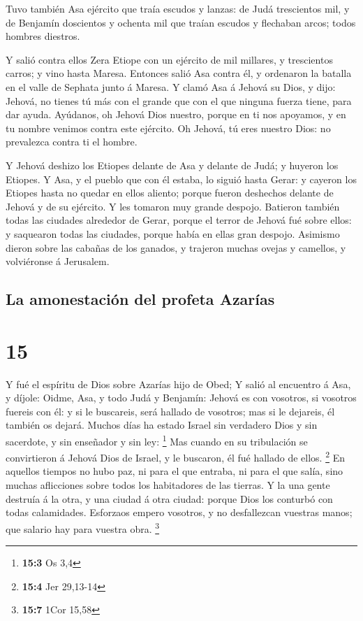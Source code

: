  Tuvo también Asa ejército que traía escudos y lanzas: de
Judá trescientos mil, y de Benjamín doscientos y ochenta mil que traían
escudos y flechaban arcos; todos hombres diestros.

 Y salió contra ellos Zera Etiope con un ejército de mil
millares, y trescientos carros; y vino hasta Maresa. 
Entonces salió Asa contra él, y ordenaron la batalla en el valle de
Sephata junto á Maresa.  Y clamó Asa á Jehová su Dios, y
dijo: Jehová, no tienes tú más con el grande que con el que ninguna
fuerza tiene, para dar ayuda. Ayúdanos, oh Jehová Dios nuestro, porque
en ti nos apoyamos, y en tu nombre venimos contra este ejército. Oh
Jehová, tú eres nuestro Dios: no prevalezca contra ti el hombre.

 Y Jehová deshizo los Etiopes delante de Asa y delante de
Judá; y huyeron los Etiopes.  Y Asa, y el pueblo que con
él estaba, lo siguió hasta Gerar: y cayeron los Etiopes hasta no quedar
en ellos aliento; porque fueron deshechos delante de Jehová y de su
ejército. Y les tomaron muy grande despojo.  Batieron
también todas las ciudades alrededor de Gerar, porque el terror de
Jehová fué sobre ellos: y saquearon todas las ciudades, porque había en
ellas gran despojo.  Asimismo dieron sobre las cabañas de
los ganados, y trajeron muchas ovejas y camellos, y volviéronse á
Jerusalem.

\hypertarget{la-amonestaciuxf3n-del-profeta-azaruxedas}{%
\subsection{La amonestación del profeta
Azarías}\label{la-amonestaciuxf3n-del-profeta-azaruxedas}}

\hypertarget{section-14}{%
\section{15}\label{section-14}}

 Y fué el espíritu de Dios sobre Azarías hijo de Obed;
 Y salió al encuentro á Asa, y díjole: Oidme, Asa, y todo
Judá y Benjamín: Jehová es con vosotros, si vosotros fuereis con él: y
si le buscareis, será hallado de vosotros; mas si le dejareis, él
también os dejará.  Muchos días ha estado Israel sin
verdadero Dios y sin sacerdote, y sin enseñador y sin ley: \footnote{\textbf{15:3}
  Os 3,4}  Mas cuando en su tribulación se convirtieron á
Jehová Dios de Israel, y le buscaron, él fué hallado de ellos.
\footnote{\textbf{15:4} Jer 29,13-14}  En aquellos tiempos
no hubo paz, ni para el que entraba, ni para el que salía, sino muchas
aflicciones sobre todos los habitadores de las tierras.  Y
la una gente destruía á la otra, y una ciudad á otra ciudad: porque Dios
los conturbó con todas calamidades.  Esforzaos empero
vosotros, y no desfallezcan vuestras manos; que salario hay para vuestra
obra. \footnote{\textbf{15:7} 1Cor 15,58}

